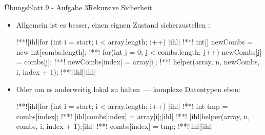 \iffull
\newsavebox\pingusaveboxa \savebox\pingusaveboxa{\tikz\pingu[pants=pingu@red!70!pingu@black!50!pingu@white,pants bands,eyes shock,wings shock];}
\newsavebox\pingusaveboxb \savebox\pingusaveboxb{\tikz\pingu[pants=pingu@red!70!pingu@black!50!pingu@white,pants bands,eyes wink,construction helmet,glasses round,glasses round fill=pingu@blue!40!pingu@yellow,glasses round opacity=.1];}
\begin{frame}[c,fragile]{Übungsblatt 9 - Aufgabe 3\hfill Rekursive Sicherheit}
    \SetupLstHl{}\begin{itemize}\itemsep4pt
        \item<4-> Allgemein ist es besser, einen eignen  Zustand sicherzustellen :
\begin{plainjava}
!**!|ihl|for (int i = start; i < array.length; i++) {|ihl|
!**!    int[] newCombs = new int[combs.length];
!**!    for(int j = 0; j < combs.length; j++) newCombs[j] = combs[j];
!**!    newCombs[index] = array[i];
!**!    helper(array, n, newCombs, i, index + 1);
!**!|ihl|}|ihl|
\end{plainjava}
    \item <8-> Oder um es anderweitig lokal zu halten~--- komplexe Datentypen eben: \begin{plainjava}
!**!|ihl|for (int i = start; i < array.length; i++) {|ihl|
!**!    int tmp = combs[index];
!**!    |ihl|combs[index] = array[i];|ihl|
!**!    |ihl|helper(array, n, combs, i, index + 1);|ihl|
!**!    combs[index] = tmp;
!**!|ihl|}|ihl|
    \end{plainjava}
    \end{itemize}\vspace*{-\baselineskip}
\end{frame}


